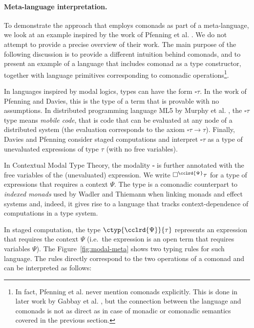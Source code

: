 
\paragraph{Meta-language interpretation.} To demonstrate the approach that employs comonads
as part of a meta-language, we look at an example inspired by the work of Pfenning et al.
\cite{logic-modal-reconstruction,logic-cmtt}. We do not attempt to provide a precise overview of
their work. The main purpose of the following discussion is to provide a different intuition behind
comonads, and to present an example of a language that includes comonad as a type constructor,
together with language primitives corresponding to comonadic operations\footnote{In fact,
Pfenning et al. never mention comonads explicitly. This is done in later work by Gabbay et al.
\cite{logic-cmtt-semantics},  but the connection between the language and comonads
is not as direct as in case of monadic or comonadic semantics covered in the previous section.}.

In languages inspired by modal logics, types can have the form $\square \tau$. In the work of
Pfenning and Davies, this is the type of a term that is provable with no assumptions. In distributed
programming language ML5 by Murphy et al. \cite{app-distributed-ml5,logic-distributed-calculus}, the
$\square \tau$ type means \emph{mobile code}, that is code that can be evaluated at any node of a
distributed system (the evaluation corresponds to the axiom $\square \tau \rightarrow \tau$).
Finally, Davies and Pfenning \cite{logic-modal-staged} consider staged computations and interpret
$\square \tau$ as a type of unevaluated expressions of type $\tau$ (with no free variables).

In Contextual Modal Type Theory, the modality $\square$ is further annotated with the free variables
of the (unevaluated) expression. We write $\square^{\cclrd{\Psi}} \tau$ for a type of expressions
that requires a context $\Psi$. The type is a comonadic counterpart to \emph{indexed monads} used by
Wadler and Thiemann when linking monads and effect systems and, indeed, it gives rise to a language
that tracks context-dependence of computations in a type system.

In staged computation, the type $\ctyp{\cclrd{\Psi}}{\tau}$ represents an expression
that requires the context $\Psi$ (i.e.~the expression is an open term that requires variables $\Psi$).
The Figure~\ref{fig:modal-meta} shows two typing rules for such language. The rules directly
correspond to the two operations of a comonad and can be interpreted as follows:

